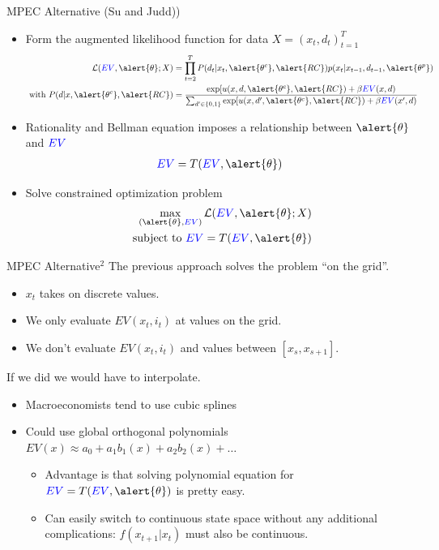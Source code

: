 \documentclass[xcolor=pdftex,dvipsnames,table,mathserif,aspectratio=169]{beamer}
\begin{document}
\begin{frame}{MPEC Alternative (Su and Judd))}
\begin{itemize}
\item Form the augmented likelihood function for data $X = (x_t, d_t)_{t=1}^T$
\begin{align*}
\mathcal{L}(\textcolor{blue}{EV}, \alert{\theta}; X) &= \prod_{t=2}^T P(d_t | x_t, \alert{\theta^c}, \alert{RC}) p(x_t | x_{t-1}, d_{t-1},\alert{\theta^p})\\
\mbox{ with }  P(d | x, \alert{\theta^c}, \alert{RC}) &= \frac{\exp[u(x,d,\alert{\theta^c},\alert{RC}) + \beta \textcolor{blue}{EV}(x,d)}
{\sum_{d' \in \{0,1\}} \exp[u(x,d',\alert{\theta^c},\alert{RC}) + \beta \textcolor{blue}{EV}(x',d)}\\
\end{align*}
\item Rationality and Bellman equation imposes a relationship between $\alert{\theta}$ and $\textcolor{blue}{EV}$
\begin{align*}
\textcolor{blue}{EV} = T(\textcolor{blue}{EV},\alert{\theta})
\end{align*}
\item Solve constrained optimization problem
\begin{align*}
\max_{(\alert{\theta},\textcolor{blue}{EV})} \mathcal{L}(\textcolor{blue}{EV}, \alert{\theta}; X)\\
\mbox{ subject to }  \textcolor{blue}{EV} = T(\textcolor{blue}{EV},\alert{\theta})
\end{align*}
\end{itemize}
\end{frame}


\begin{frame}{MPEC Alternative$^2$}
The previous approach solves the problem ``on the grid''.
\begin{itemize}
\item $x_t$ takes on discrete values.
\item We only evaluate $EV(x_t,i_t)$ at values on the grid.
\item We don't evaluate $EV(x_t,i_t)$ and values between $[x_s,x_{s+1}]$.
\end{itemize}
If we did we would have to \alert{interpolate}.
\begin{itemize}
\item Macroeconomists tend to use \alert{cubic splines}
\item Could use global orthogonal polynomials $EV(x) \approx a_0 + a_1 b_1(x)+ a_2 b_2(x) + \ldots$
\begin{itemize}
\item Advantage is that solving polynomial equation for $\textcolor{blue}{EV} = T(\textcolor{blue}{EV},\alert{\theta})$ is pretty easy.
\item Can easily switch to continuous state space without any additional complications:  $f(x_{t+1} | x_{t})$ must also be continuous.
\end{itemize}
\end{itemize}
\end{frame}
\end{document}
